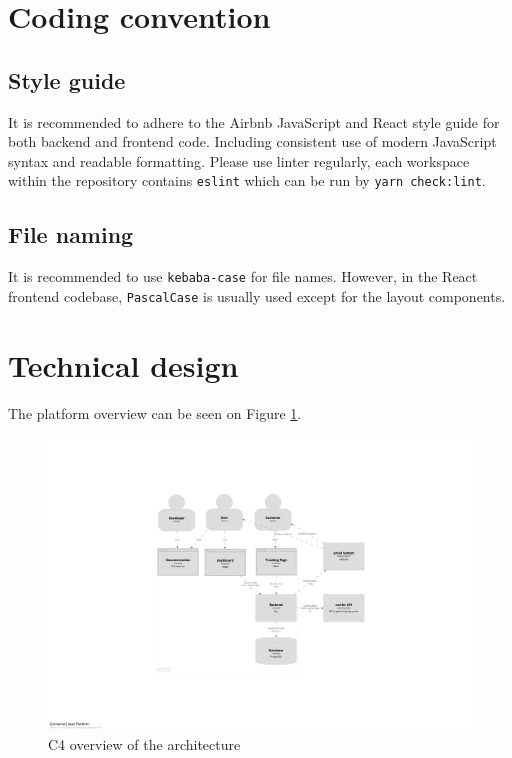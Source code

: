 \section{Coding convention}
\label{attachments:programming-platform.coding-convention}
\subsection{Style guide}
It is recommended to adhere to the Airbnb JavaScript and React style guide for both backend and frontend code.
Including consistent use of modern Java\-Script syntax and readable formatting.
Please use linter regularly, each workspace within the repository contains \texttt{eslint} which can be run by \texttt{yarn check:lint}.
\subsection{File naming}
It is recommended to use \texttt{kebaba-case} for file names.
However, in the React frontend codebase, \texttt{PascalCase} is usually used except for the layout components.

\section{Technical design}
\label{attachments:programming-platform.technical-design}

The platform overview can be seen on Figure \ref{imgdocs:programming-platform.technical-design}.

\begin{figure}[H]\centering
\includegraphics[width=140mm]{img/chap04/fig_architecture.png}
\caption{C4 overview of the architecture}
\label{imgdocs:programming-platform.technical-design}
\end{figure}


